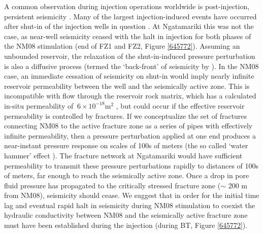 A common observation during injection operations worldwide is post-injection, persistent seismicity \citep[e.g.][]{Fehler_1998,Rutledge_2003,Shapiro_2002}. Many of the largest injection-induced events have occurred after shut-in of the injection wells in question \citep[e.g.][at Basel]{Mukuhira_2017}. At Ngatamariki this was not the case, as near-well seismicity ceased with the halt in injection for both phases of the NM08 stimulation (end of FZ1 and FZ2, Figure \ref{645772}). Assuming an unbounded reservoir, the relaxation of the shut-in-induced pressure perturbation is also a diffusive process (termed the `back-front' of seismicity by \citet{Parotidis_2004}). In the NM08 case, an immediate cessation of seismicity on shut-in would imply nearly infinite reservoir \gls{permeability} between the well and the seismically active zone. This is incompatible with flow through the reservoir rock matrix, which has a calculated in-situ \gls{permeability} of $~6\times10^{-18}$m$^2$ \citep{Cant_2018}, but could occur if the effective reservoir \gls{permeability} is controlled by fractures. If we conceptualize the set of fractures connecting NM08 to the active fracture zone as a series of pipes with effectively infinite \gls{permeability}, then a pressure perturbation applied at one end produces a near-instant pressure response on scales of 100s of meters (the so called `water hammer' effect \citep{Ghidaoui_2005}). The fracture network at Ngatamariki would have sufficient \gls{permeability} to transmit these pressure perturbations rapidly to distances of 100s of meters, far enough to reach the seismically active zone. Once a drop in pore fluid pressure has propagated to the critically stressed fracture zone ($\sim$ 200 m from NM08), seismicity should cease. We suggest that in order for the initial time lag and eventual rapid halt in seismicity during NM08 stimulation to coexist the hydraulic conductivity between NM08 and the seismically active fracture zone must have been established during the injection (during BT, Figure \ref{645772}).

